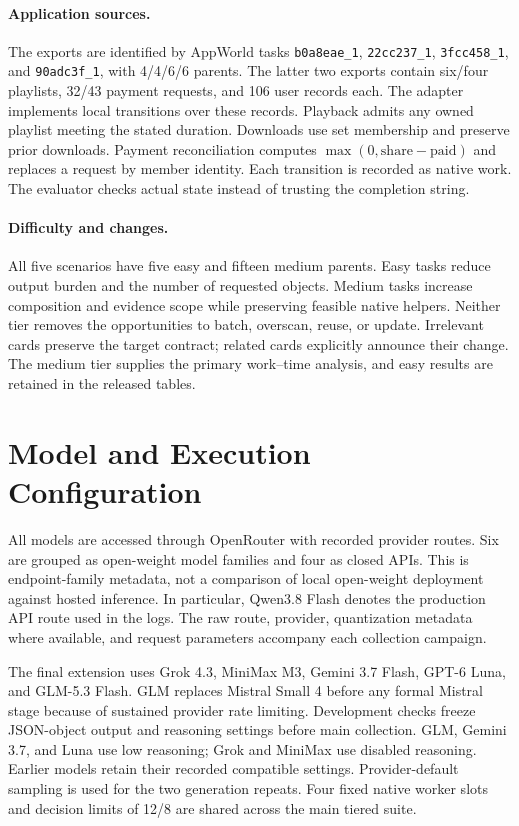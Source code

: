 \paragraph{Application sources.}
The exports are identified by AppWorld tasks \texttt{b0a8eae\_1}, \texttt{22cc237\_1}, \texttt{3fcc458\_1}, and \texttt{90adc3f\_1}, with 4/4/6/6 parents. The latter two exports contain six/four playlists, 32/43 payment requests, and 106 user records each. The adapter implements local transitions over these records. Playback admits any owned playlist meeting the stated duration. Downloads use set membership and preserve prior downloads. Payment reconciliation computes $\max(0,\mathrm{share}-\mathrm{paid})$ and replaces a request by member identity. Each transition is recorded as native work. The evaluator checks actual state instead of trusting the completion string.

\paragraph{Difficulty and changes.}
All five scenarios have five easy and fifteen medium parents. Easy tasks reduce output burden and the number of requested objects. Medium tasks increase composition and evidence scope while preserving feasible native helpers. Neither tier removes the opportunities to batch, overscan, reuse, or update. Irrelevant cards preserve the target contract; related cards explicitly announce their change. The medium tier supplies the primary work--time analysis, and easy results are retained in the released tables.

\section{Model and Execution Configuration}
\label{app:models}
All models are accessed through OpenRouter with recorded provider routes. Six are grouped as open-weight model families and four as closed APIs. This is endpoint-family metadata, not a comparison of local open-weight deployment against hosted inference. In particular, Qwen3.8 Flash denotes the production API route used in the logs. The raw route, provider, quantization metadata where available, and request parameters accompany each collection campaign.

The final extension uses Grok 4.3, MiniMax M3, Gemini 3.7 Flash, GPT-6 Luna, and GLM-5.3 Flash. GLM replaces Mistral Small 4 before any formal Mistral stage because of sustained provider rate limiting. Development checks freeze JSON-object output and reasoning settings before main collection. GLM, Gemini 3.7, and Luna use low reasoning; Grok and MiniMax use disabled reasoning. Earlier models retain their recorded compatible settings. Provider-default sampling is used for the two generation repeats. Four fixed native worker slots and decision limits of 12/8 are shared across the main tiered suite.

